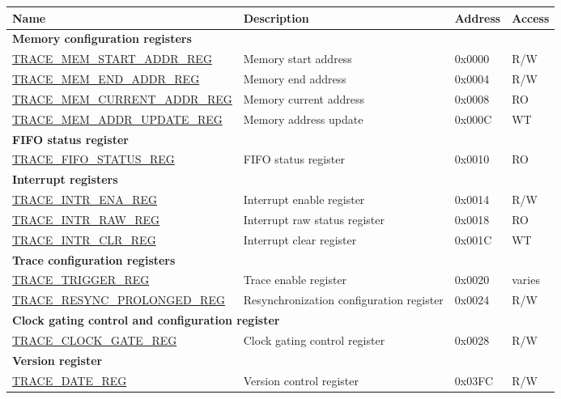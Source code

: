\begin{longtable}{ | p{6cm} | p{7.2cm} | p{1.3cm} | p{1cm} | }
\hline\rowcolor{lightgray}
\textbf{Name} & \textbf{Description} &  \textbf{Address} & \textbf{Access} \\ \hline
\endhead
\multicolumn{4}{|l|}{\textbf{Memory configuration registers}} \\ \hline
\hyperref[regdesc:TRACEMEMSTARTADDRREG]{TRACE\_MEM\_START\_ADDR\_REG} & Memory start address & 0x0000 & R/W \\ \hline
\hyperref[regdesc:TRACEMEMENDADDRREG]{TRACE\_MEM\_END\_ADDR\_REG} & Memory end address & 0x0004 & R/W \\ \hline
\hyperref[regdesc:TRACEMEMCURRENTADDRREG]{TRACE\_MEM\_CURRENT\_ADDR\_REG} & Memory current address & 0x0008 & RO \\ \hline
\hyperref[regdesc:TRACEMEMADDRUPDATEREG]{TRACE\_MEM\_ADDR\_UPDATE\_REG} & Memory address update & 0x000C & WT \\ \hline
\multicolumn{4}{|l|}{\textbf{FIFO status register}} \\ \hline
\hyperref[regdesc:TRACEFIFOSTATUSREG]{TRACE\_FIFO\_STATUS\_REG} & FIFO status register & 0x0010 & RO \\ \hline
\multicolumn{4}{|l|}{\textbf{Interrupt registers}} \\ \hline
\hyperref[regdesc:TRACEINTRENAREG]{TRACE\_INTR\_ENA\_REG} & Interrupt enable register & 0x0014 & R/W \\ \hline
\hyperref[regdesc:TRACEINTRRAWREG]{TRACE\_INTR\_RAW\_REG} & Interrupt raw status register & 0x0018 & RO \\ \hline
\hyperref[regdesc:TRACEINTRCLRREG]{TRACE\_INTR\_CLR\_REG} & Interrupt clear register & 0x001C & WT \\ \hline
\multicolumn{4}{|l|}{\textbf{Trace configuration registers}} \\ \hline
\hyperref[regdesc:TRACETRIGGERREG]{TRACE\_TRIGGER\_REG} & Trace enable register & 0x0020 & varies \\ \hline
\hyperref[regdesc:TRACERESYNCPROLONGEDREG]{TRACE\_RESYNC\_PROLONGED\_REG} & Resynchronization configuration register & 0x0024 & R/W \\ \hline
\multicolumn{4}{|l|}{\textbf{Clock gating control and configuration register}} \\ \hline
\hyperref[regdesc:TRACECLOCKGATEREG]{TRACE\_CLOCK\_GATE\_REG} & Clock gating control register & 0x0028 & R/W \\ \hline
\multicolumn{4}{|l|}{\textbf{Version register}} \\ \hline
\hyperref[regdesc:TRACEDATEREG]{TRACE\_DATE\_REG} & Version control register & 0x03FC & R/W \\ \hline
\end{longtable}
